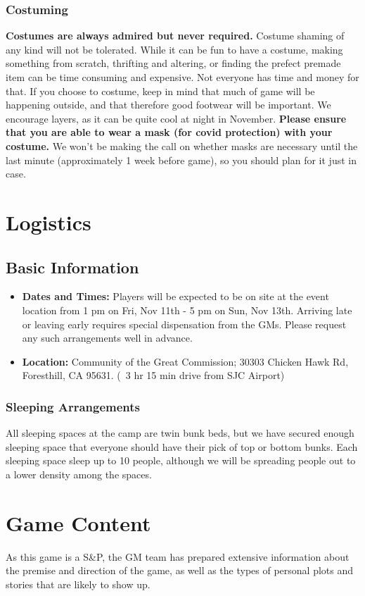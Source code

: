 \documentclass[sheet]{GL2020}
\begin{document}
\subsubsection{Costuming} 
\textbf{Costumes are always admired but never required.} Costume shaming of any kind will not be tolerated. While it can be fun to have a costume, making something from scratch, thrifting and altering, or finding the prefect premade item can be time consuming and expensive. Not everyone has time and money for that. If you choose to costume, keep in mind that much of game will be happening outside, and that therefore good footwear will be important. We encourage layers, as it can be quite cool at night in November. \textbf{Please ensure that you are able to wear a mask (for covid protection) with your costume.} We won’t be making the call on whether masks are necessary until the last minute (approximately 1 week before game), so you should plan for it just in case.


\section{Logistics}
\subsection{Basic Information}
\begin{itemize}
  \item \textbf{Dates and Times:} Players will be expected to be on site at the event location from 1 pm  on Fri, Nov 11th - 5 pm on Sun, Nov 13th. Arriving late or leaving early requires special dispensation from the GMs. Please request any such arrangements well in advance.
  \item \textbf{Location:} Community of the Great Commission; 30303 Chicken Hawk Rd, Foresthill, CA 95631. (~3 hr 15 min drive from SJC Airport)
\end{itemize}

\subsubsection{Sleeping Arrangements}
All sleeping spaces at the camp are twin bunk beds, but we have secured enough sleeping space that everyone should have their pick of top or bottom bunks. Each sleeping space sleep up to 10 people, although we will be spreading people out to a lower density among the spaces.

\section{Game Content}
As this game is a S\&P, the GM team has prepared extensive information about the premise and direction of the game, as well as the types of personal plots and stories that are likely to show up.
\end{document}
